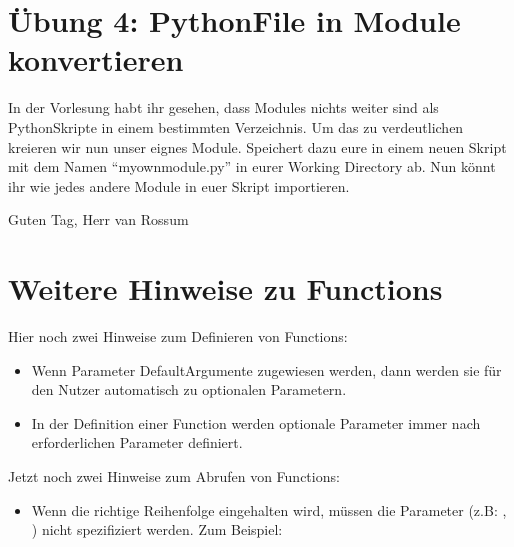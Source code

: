 \documentclass[letterpaper,10pt,english]{sphinxmanual}
\begin{document}
\section{Übung 4: Python\sphinxhyphen{}File in Module konvertieren}
\label{\detokenize{02_03_Functions:ubung-4-python-file-in-module-konvertieren}}
In der Vorlesung habt ihr gesehen, dass Modules nichts weiter sind als Python\sphinxhyphen{}Skripte in einem bestimmten Verzeichnis. Um das zu verdeutlichen kreieren wir nun unser eignes Module. Speichert dazu eure   in einem neuen Skript mit dem Namen “myownmodule.py” in eurer Working Directory ab. Nun könnt ihr  wie jedes andere Module in euer Skript importieren.

\begin{sphinxVerbatim}[commandchars=\\\{\}]
 

\end{sphinxVerbatim}

\begin{sphinxVerbatim}[commandchars=\\\{\}]
\PYGZsq{}Guten Tag, Herr van Rossum\PYGZsq{}
\end{sphinxVerbatim}


\section{Weitere Hinweise zu Functions}
\label{\detokenize{02_03_Functions:weitere-hinweise-zu-functions}}
Hier noch zwei Hinweise zum Definieren von Functions:
\begin{itemize}
\item {} 
Wenn Parameter Default\sphinxhyphen{}Argumente zugewiesen werden, dann werden sie für den Nutzer automatisch zu optionalen Parametern.

\item {} 
In der Definition einer Function werden optionale Parameter immer nach erforderlichen Parameter definiert.

\end{itemize}

Jetzt noch zwei Hinweise zum Abrufen von Functions:
\begin{itemize}
\item {} 
Wenn die richtige Reihenfolge eingehalten wird, müssen die Parameter (z.B: , ) nicht spezifiziert werden. Zum Beispiel:

\end{itemize}
\end{document}
